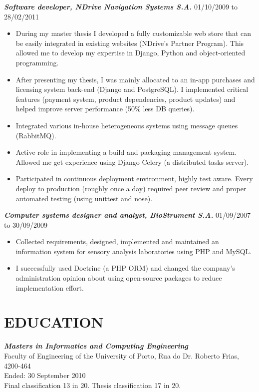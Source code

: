 \documentclass[line,margin]{resume}
\begin{document}
\begin{resume}
    {\sl\bf Software developer, NDrive Navigation Systems S.A.} \hfill 01/10/2009 to 28/02/2011
     \begin{itemize}
         \item During my master thesis I developed a fully customizable web store that can be easily integrated in existing websites (NDrive's Partner Program). This allowed me to develop my expertise in Django, Python and object-oriented programming.
         \item After presenting my thesis, I was mainly allocated to an in-app purchases and licensing system back-end (Django and PostgreSQL). I implemented critical features (payment system, product dependencies, product updates) and helped improve server performance (50\% less DB queries).
        \item Integrated various in-house heterogeneous systems using message queues (RabbitMQ).
        \item Active role in implementing a build and packaging management system. Allowed me get experience using Django Celery (a distributed tasks server).
        \item Participated in continuous deployment  environment, highly test aware. Every deploy to production (roughly once a day) required peer review and proper automated testing (using unittest and nose).
     \end{itemize}
    {\sl\bf Computer systems designer and analyst, BioStrument S.A.} \hfill 01/09/2007 to 30/09/2009
     \begin{itemize}
         \item Collected requirements, designed, implemented and maintained an information system for sensory analysis laboratories using PHP and MySQL.
         \item I successfully used Doctrine (a PHP ORM) and changed the company's administration opinion about using open-source packages to reduce implementation effort.
     \end{itemize}

\section{EDUCATION}
    {\sl\bf Masters in Informatics and Computing Engineering}\\
    Faculty of Engineering of the University of Porto, Rua do Dr. Roberto Frias, 4200-464\\
    Ended: 30 September 2010\\
    Final classification 13 in 20. Thesis classification 17 in 20.

\end{resume}
\end{document}
